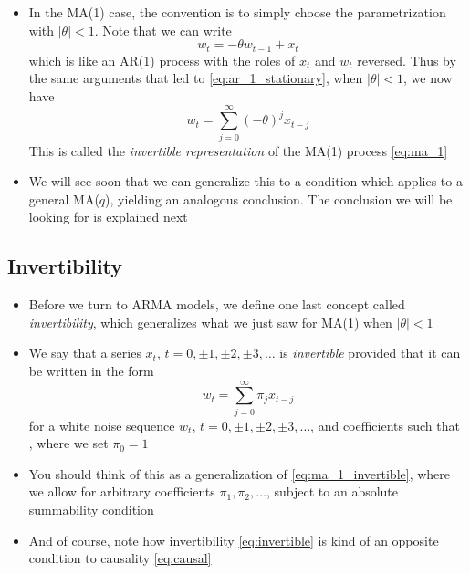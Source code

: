 \documentclass{article}
\begin{document}
\begin{itemize}
\item In the MA(1) case, the convention is to simply choose the parametrization
  with $|\theta| <  1$. Note that we can write
  \[
  w_t = -\theta w_{t-1} + x_t 
  \]
  which is like an AR(1) process with the roles of $x_t$ and $w_t$
  reversed. Thus by the same arguments that led to \eqref{eq:ar_1_stationary},
  when $|\theta| < 1$, we now have 
  \begin{equation}
  \label{eq:ma_1_invertible}
  w_t = \sum_{j=0}^\infty (-\theta)^j x_{t-j} 
  \end{equation}
  This is called the \emph{invertible representation} of the MA(1) process
  \eqref{eq:ma_1} 

\item We will see soon that we can generalize this to a condition which applies 
  to a general MA($q$), yielding an analogous conclusion. The conclusion we will
  be looking for is explained next 
\end{itemize}

\subsection{Invertibility}

\begin{itemize}
\item Before we turn to ARMA models, we define one last concept called
  \emph{invertibility}, which generalizes what we just saw for MA(1) when
  $|\theta| < 1$ 

\item We say that a series $x_t$, $t = 0, \pm 1, \pm 2, \pm 3, \dots$ is
  \emph{invertible} provided that it can be written in the form
  \begin{equation}
  \label{eq:invertible}
  w_t = \sum_{j=0}^\infty \pi_j x_{t-j}
  \end{equation}
  for a white noise sequence $w_t$, $t = 0, \pm 1, \pm 2, \pm 3, \dots$,
  and coefficients such that , where 
  we set $\pi_0 = 1$

\item You should think of this as a generalization of
  \eqref{eq:ma_1_invertible}, where we allow for arbitrary coefficients
  $\pi_1,\pi_2,\dots$, subject to an absolute summability condition   

\item And of course, note how invertibility \eqref{eq:invertible} is kind of an
  opposite condition to causality \eqref{eq:causal}  
\end{itemize}
\end{document}
